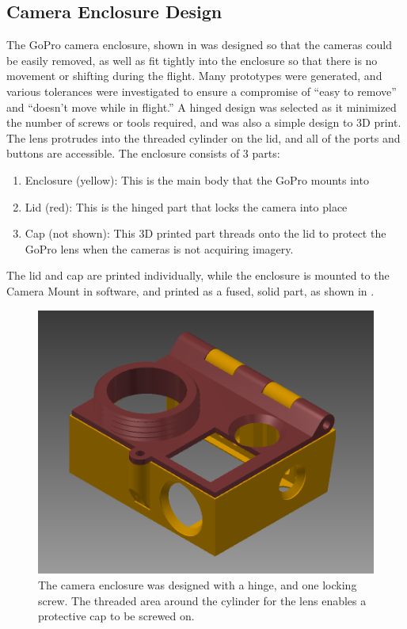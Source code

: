 	\subsection{Camera Enclosure Design}
	The GoPro camera enclosure, shown in  was designed so that the cameras could be easily removed, as well as fit tightly into the enclosure so that there is no movement or shifting during the flight.  Many prototypes were generated, and various tolerances were investigated to ensure a compromise of ``easy to remove'' and ``doesn't move while in flight.''  A hinged design was selected as it minimized the number of screws or tools required, and was also a simple design to 3D print.  The lens protrudes into the threaded cylinder on the lid, and all of the ports and buttons are accessible.  The enclosure consists of 3 parts:
	\begin{enumerate}
		\item Enclosure (yellow): This is the main body that the GoPro mounts into
		\item Lid (red): This is the hinged part that locks the camera into place
		\item Cap (not shown): This 3D printed part threads onto the lid to protect the GoPro lens when the cameras is not acquiring imagery.
	\end{enumerate}
	The lid and cap are printed individually, while the enclosure is mounted to the Camera Mount in software, and printed as a fused, solid part, as shown in .
	\begin{figure}[H]
		\centering
		\includegraphics[scale = 0.4]{../figures/cad/cameraEnclosure.png}
		\caption{The camera enclosure was designed with a hinge, and one locking screw.  The threaded area around the cylinder for the lens enables a protective cap to be screwed on.}
		\label{fig:camEnclosure}
	\end{figure}

